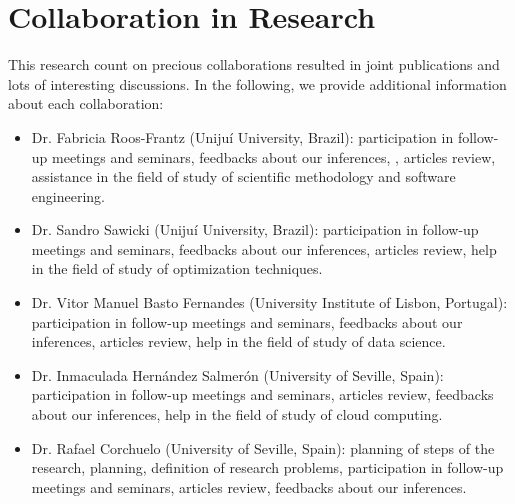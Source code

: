 \section{Collaboration in Research}  
\label{sec:collaboration}  
\noindent

This research count on precious collaborations resulted in joint publications and lots of interesting discussions. In the following, we provide additional information about each collaboration:

\begin{itemize}
\item Dr. Fabricia Roos-Frantz (Unijuí University, Brazil): participation in follow-up meetings and seminars, feedbacks about our inferences, , articles review, assistance in the field of study of scientific methodology and software engineering.
\item Dr. Sandro Sawicki (Unijuí University, Brazil): participation in follow-up meetings and seminars, feedbacks about our inferences, articles review, help in the field of study of optimization techniques.
\item Dr. Vitor Manuel Basto Fernandes (University Institute of Lisbon, Portugal): participation in follow-up meetings and seminars, feedbacks about our inferences, articles review, help in the field of study of data science.
\item Dr. Inmaculada Hernández Salmerón (University of Seville, Spain): participation in follow-up meetings and seminars, articles review, feedbacks about our inferences, help in the field of study of cloud computing.
\item Dr. Rafael Corchuelo (University of Seville, Spain): planning of steps of the research, planning, definition of research problems, participation in follow-up meetings and seminars, articles review, feedbacks about our inferences.
\end{itemize}
%

